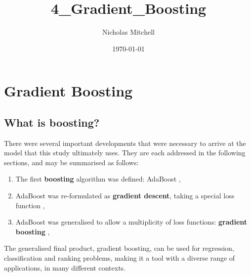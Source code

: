 \documentclass{article}
\author{Nicholas Mitchell}
\date{\today}
\title{4\_Gradient\_Boosting}
\begin{document}
\maketitle
\tableofcontents

\pagebreak

\section{Gradient Boosting \label{chapter-gradient-boosting}}
\label{sec-1}


\subsection{What is boosting? \label{AdaBoost}}
\label{sec-1-1}

There were several important developments that were necessary to arrive at the model that this study ultimately uses. They are each addressed in the following sections, and may be summarised as follows:

\begin{enumerate}
\item The first \textbf{boosting} algorithm was defined: AdaBoost \cite{freund1996experiments}, \cite{Freund1997119}
\item AdaBoost was re-formulated as \textbf{gradient descent}, taking a special loss function \cite{Breiman97arcingthe}, \cite{breiman1998arcing}
\item AdaBoost was generalised to allow a multiplicity of loss functions: \textbf{gradient boosting} \cite{friedman2001greedy}, \cite{friedman2000additive}
\end{enumerate}

The generalised final product, gradient boosting, can be used for regression, classification and ranking problems, making it a tool with a diverse range of applications, in many different contexts.
\end{document}
